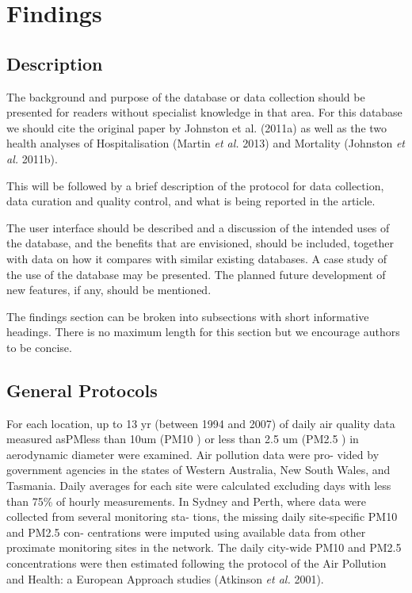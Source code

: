 


\section{Findings}


\subsection{Description}\label{description}

The background and purpose of the database or data collection should be
presented for readers without specialist knowledge in that area. For
this database we should cite the original paper by Johnston et al.
(2011a) as well as the two health analyses of Hospitalisation (Martin
\emph{et al.} 2013) and Mortality (Johnston \emph{et al.} 2011b).

This will be followed by a brief description of the protocol for data
collection, data curation and quality control, and what is being
reported in the article.

The user interface should be described and a discussion of the intended
uses of the database, and the benefits that are envisioned, should be
included, together with data on how it compares with similar existing
databases. A case study of the use of the database may be presented. The
planned future development of new features, if any, should be mentioned.

The findings section can be broken into subsections with short
informative headings. There is no maximum length for this section but we
encourage authors to be concise.

\subsection{General Protocols}\label{general-protocols}

For each location, up to 13 yr (between 1994 and 2007) of daily air
quality data measured asPMless than 10um (PM10 ) or less than 2.5 um
(PM2.5 ) in aerodynamic diameter were examined. Air pollution data were
pro- vided by government agencies in the states of Western Australia,
New South Wales, and Tasmania. Daily averages for each site were
calculated excluding days with less than 75\% of hourly measurements. In
Sydney and Perth, where data were collected from several monitoring sta-
tions, the missing daily site-specific PM10 and PM2.5 con- centrations
were imputed using available data from other proximate monitoring sites
in the network. The daily city-wide PM10 and PM2.5 concentrations were
then estimated following the protocol of the Air Pollution and Health: a
European Approach studies (Atkinson \emph{et al.} 2001).

